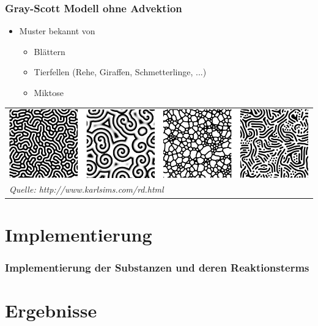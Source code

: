 \documentclass[aspectratio=32]{beamer}
\newcommand{\blob}{\rule[2.2pt]{3pt}{3pt}}
\newcommand{\sectionframe}{\begin{frame}
	\begin{center}
		\textcolor{simtechred}{\Large\insertsection}
	\end{center}
\end{frame}}
\newcommand{\reditem}{\item[\textcolor{simtechred}{$\blob$}]}
\begin{document}
\begin{frame}
\frametitle{Gray-Scott Modell ohne Advektion}

\begin{itemize}
	\reditem Muster bekannt von
\begin{itemize}
	\item	Blättern
	\item Tierfellen (Rehe, Giraffen, Schmetterlinge, ...)
	\item Miktose
\end{itemize}
\end{itemize}
\begin{tabular}{l}
	\includegraphics[width=\textwidth,keepaspectratio]{Bilder/gs_scenarios.png} \\
	\textit{Quelle: http://www.karlsims.com/rd.html} \\
\end{tabular}

\end{frame}

\section{Implementierung}
\sectionframe

\begin{frame}
\frametitle{Implementierung der Substanzen und deren Reaktionsterms}

\end{frame}

\section{Ergebnisse}
\sectionframe
\end{document}
